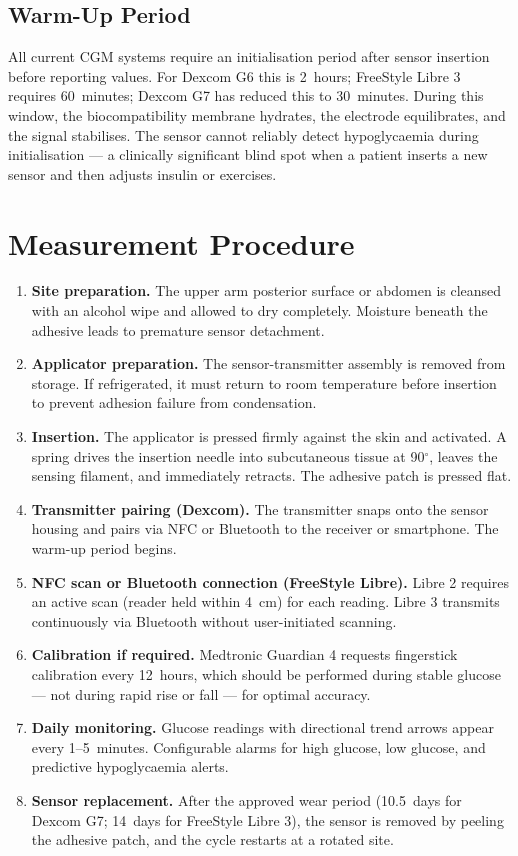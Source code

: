 \subsection*{Warm-Up Period}

All current CGM systems require an initialisation period after sensor insertion before reporting values. For Dexcom G6 this is 2~hours; FreeStyle Libre 3 requires 60~minutes; Dexcom G7 has reduced this to 30~minutes. During this window, the biocompatibility membrane hydrates, the electrode equilibrates, and the signal stabilises. The sensor cannot reliably detect hypoglycaemia during initialisation --- a clinically significant blind spot when a patient inserts a new sensor and then adjusts insulin or exercises.

\section{Measurement Procedure}

\begin{enumerate}
  \item \textbf{Site preparation.} The upper arm posterior surface or abdomen is cleansed with an alcohol wipe and allowed to dry completely. Moisture beneath the adhesive leads to premature sensor detachment.
  \item \textbf{Applicator preparation.} The sensor-transmitter assembly is removed from storage. If refrigerated, it must return to room temperature before insertion to prevent adhesion failure from condensation.
  \item \textbf{Insertion.} The applicator is pressed firmly against the skin and activated. A spring drives the insertion needle into subcutaneous tissue at 90$^\circ$, leaves the sensing filament, and immediately retracts. The adhesive patch is pressed flat.
  \item \textbf{Transmitter pairing (Dexcom).} The transmitter snaps onto the sensor housing and pairs via NFC or Bluetooth to the receiver or smartphone. The warm-up period begins.
  \item \textbf{NFC scan or Bluetooth connection (FreeStyle Libre).} Libre 2 requires an active scan (reader held within 4~cm) for each reading. Libre 3 transmits continuously via Bluetooth without user-initiated scanning.
  \item \textbf{Calibration if required.} Medtronic Guardian 4 requests fingerstick calibration every 12~hours, which should be performed during stable glucose --- not during rapid rise or fall --- for optimal accuracy.
  \item \textbf{Daily monitoring.} Glucose readings with directional trend arrows appear every 1--5~minutes. Configurable alarms for high glucose, low glucose, and predictive hypoglycaemia alerts.
  \item \textbf{Sensor replacement.} After the approved wear period (10.5~days for Dexcom G7; 14~days for FreeStyle Libre 3), the sensor is removed by peeling the adhesive patch, and the cycle restarts at a rotated site.
\end{enumerate}

